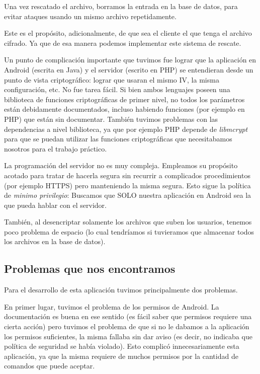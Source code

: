Una vez rescatado el archivo, borramos la entrada en la base de datos, para evitar ataques usando un mismo archivo repetidamente.

Este es el propósito, adicionalmente, de que sea el cliente el que tenga el archivo cifrado. Ya que de esa manera podemos implementar este sistema de rescate.

Un punto de complicación importante que tuvimos fue lograr que la aplicación en Android (escrita en Java) y el servidor (escrito en PHP) se entendieran desde un punto de vista criptográfico: lograr que usaran el mismo IV, la misma configuración, etc. No fue tarea fácil. Si bien ambos lenguajes poseen una biblioteca de funciones criptográficas de primer nivel, no todos los parámetros están debidamente documentados, incluso habiendo funciones (por ejemplo en PHP) que están sin documentar. También tuvimos problemas con las dependencias a nivel biblioteca, ya que por ejemplo PHP depende de \textit{libmcrypt} para que se puedan utilizar las funciones criptográficas que necesitabamos nosotros para el trabajo práctico.

La programación del servidor no es muy compleja. Empleamos su propósito acotado para tratar de hacerla segura sin recurrir a complicados
procedimientos (por ejemplo HTTPS) pero manteniendo la misma segura. Esto sigue la política de \textit{minimo privilegio}: Buscamos que SOLO
nuestra aplicación en Android sea la que pueda hablar con el servidor.

También, al desencriptar solamente los archivos que suben los usuarios, tenemos poco problema
de espacio (lo cual tendríamos si tuvieramos que almacenar todos los archivos en la base de
datos).

\subsection{Problemas que nos encontramos}

Para el desarrollo de esta aplicación tuvimos principalmente dos problemas.

En primer lugar, tuvimos el problema de los permisos de Android. La
documentaci\'on es buena en ese sentido (es fácil saber que permisos requiere
una cierta acción) pero tuvimos el problema de que si no le dabamos a la
aplicación los permisos suficientes, la misma fallaba sin dar aviso (es
decir, no indicaba que política de seguridad se había violado). Esto
complicó innecesariamente esta aplicación, ya que la misma requiere de
muchos permisos por la cantidad de comandos que puede aceptar.

